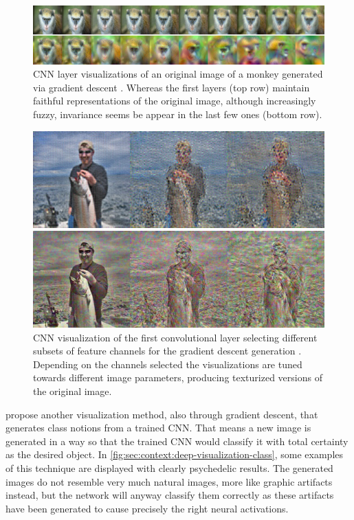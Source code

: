 \begin{figure}[htbp]
  \includegraphics[width=\textwidth]{gfx/deep-visualization-reconstructions-1}
  \caption{
    CNN layer visualizations of an original image of a monkey generated via gradient descent \cite{Mahendran2014}.
    Whereas the first layers (top row) maintain faithful representations of the original image, although increasingly fuzzy, invariance seems be appear in the last few ones (bottom row).
  }
  \label{fig:sec:context:deep-visualization:deep-visualization-reconstructions-1}
\end{figure}

\begin{figure}[htbp]
  \includegraphics[width=\textwidth]{gfx/deep-visualization-reconstructions-2}
  \caption{
    CNN visualization of the first convolutional layer selecting different subsets of feature channels for the gradient descent generation \cite{Mahendran2014}.
    Depending on the channels selected the visualizations are tuned towards different image parameters, producing texturized versions of the original image.
  }
  \label{fig:sec:context:deep-visualization:deep-visualization-reconstructions-2}
\end{figure}

\citet{Simonyan2014B} propose another visualization method, also through gradient descent, that generates class notions from a trained CNN.
That means a new image is generated in a way so that the trained CNN would classify it with total certainty as the desired object.
In \autoref{fig:sec:context:deep-visualization-class}, some examples of this technique are displayed with clearly psychedelic results.
The generated images do not resemble very much natural images, more like graphic artifacts instead, but the network will anyway classify them correctly as these artifacts have been generated to cause precisely the right neural activations.

